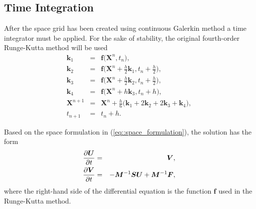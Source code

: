 \subsection{Time Integration}
After the space grid has been created using continuous Galerkin method a time integrator must be applied. For the sake of stability, the original fourth-order Runge-Kutta method will be used
\begin{eqnarray*}
  \bm{k}_1 & = & \bm{f}\big(\bm{X}^n,t_n\big), \\
  \bm{k}_2 & = & \bm{f}\bigg(\bm{X}^n + \frac{h}{2}\bm{k}_1, t_n + \frac{h}{2}\bigg), \\
  \bm{k}_3 & = & \bm{f}\bigg(\bm{X}^n + \frac{h}{2}\bm{k}_2, t_n + \frac{h}{2}\bigg), \\
  \bm{k}_4 & = & \bm{f}\big(\bm{X}^n + h\bm{k}_3, t_n + h\big), \\
  \bm{X}^{n+1} & = & \bm{X}^n + \frac{h}{6}\big(\bm{k}_1 + 2\bm{k}_2 + 2\bm{k}_3 + \bm{k}_4\big), \\
  t_{n+1} & = & t_n + h.
\end{eqnarray*}

Based on the space formulation in (\ref{eq::space_formulation}), the solution has the form
\begin{eqnarray}
  \label{eq::Numerical_ODE}
  \frac{\partial \bm{U}}{\partial t} & = & \bm{V}, \nonumber \\
  \frac{\partial \bm{V}}{\partial t} & = & -\bm{M}^{-1}\bm{S}\bm{U} + \bm{M}^{-1}\bm{F},
\end{eqnarray}
where the right-hand side of the differential equation is the function $\bm{f}$ used in the Runge-Kutta method.

